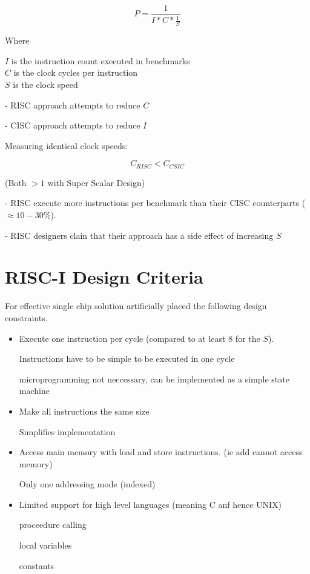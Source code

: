 \documentclass[a4paper,12pt]{article}
\begin{document}
\[ P = \frac{1}{I * C * \frac{1}{S}} \]

Where

$I$ is the instruction count executed in benchmarks \\
$C$ is the clock cycles per instruction \\
$S$ is the clock speed

- RISC approach attempts to reduce $C$

- CISC approach attempts to reduce $I$


Measuring identical clock speeds:

\[ C_{RISC} < C_{CSIC} \]

(Both $> 1$ with Super Scalar Design)

- RISC execute more instructions per benchmark than their CISC
  counterparts ($\approx 10 - 30\%$).

- RISC designers clain that their approach has a side effect of
  increasing $S$  

\section*{RISC-I Design Criteria}

For effective single chip solution artificially placed the following
design constraints.

\begin{itemize}
\item Execute one instruction per cycle (compared to at least $8$ for
the $S$).

\subitem Instructions have to be simple to be executed in one cycle

\subitem microprogramming not neccessary, can be implemented as a simple
state machine

\item Make all instructions the same size

\subitem Simplifies implementation

\item Access main memory with load and store instructions. (ie add
cannot access memory)

\subitem Only one addressing mode (indexed)

\item Limited support for high level languages (meaning C anf hence
UNIX)

\subitem proceedure calling

\subitem local variables

\subitem constants
\end{itemize}
\end{document}
